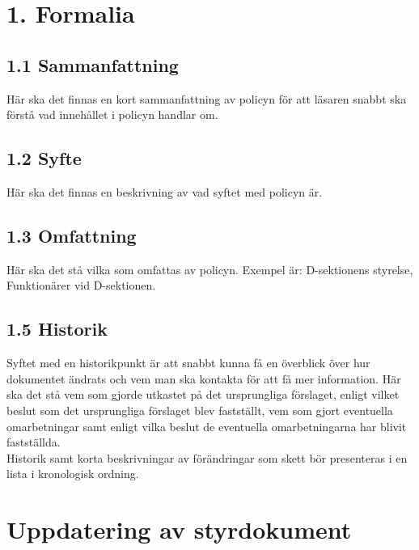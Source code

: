 \documentclass[]{dsekprotokoll}
\begin{document}
\hfill\begin{minipage}{\dimexpr\textwidth-3cm}
    \xdef\tpd{\the\prevdepth}
    \section*{1. Formalia}
    \subsection*{1.1 Sammanfattning}
    Här ska det finnas en kort sammanfattning av policyn för att läsaren
    snabbt ska förstå vad innehållet i policyn handlar om. \\

    \subsection*{1.2 Syfte}
    Här ska det finnas en beskrivning av vad syftet med policyn är. \\

    \subsection*{1.3 Omfattning}
    Här ska det stå vilka som omfattas av policyn. Exempel är: D-sektionens styrelse, Funktionärer vid D-sektionen.\\

    \subsection*{1.5 Historik}
    Syftet med en historikpunkt är att snabbt kunna få en överblick över hur
    dokumentet ändrats och vem man ska kontakta för att få mer
    information. Här ska det stå vem som gjorde utkastet på det ursprungliga
    förslaget, enligt vilket beslut som det ursprungliga förslaget blev fastställt, vem som gjort eventuella omarbetningar samt enligt vilka beslut de
    eventuella omarbetningarna har blivit fastställda.
    \\

    Historik samt korta beskrivningar av förändringar som skett bör presenteras i en lista i kronologisk ordning. \\
\end{minipage}

\prevdepth\tpd


\section{Uppdatering av styrdokument}
\end{document}
